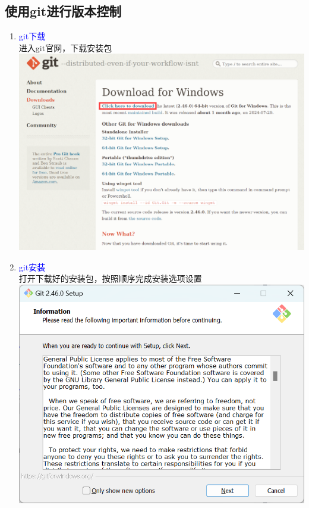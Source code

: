 \documentclass[12pt,a4paper,UTF8]{article}
\begin{document}
    \NoBgThispage
    \subsection{使用git进行版本控制}
    \begin{enumerate}
        \item \textcolor{blue}{git下载}\\
        进入git官网，下载安装包\\
        \includegraphics[scale=0.4]{pictures/git/11_1.png}

        \item \textcolor{blue}{git安装}\\
        打开下载好的安装包，按照顺序完成安装选项设置\\
        \includegraphics[scale=0.5]{pictures/git/12.png}


\end{enumerate}
\end{document}
